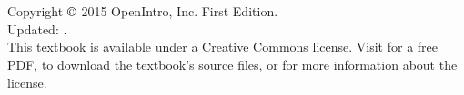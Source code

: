 \chapter*{}

\vfill

\noindent Copyright $\copyright$ 2015 OpenIntro, Inc. First Edition. \\
Updated: \versiondate. \\

\noindent This textbook is available under a Creative Commons license. %
Visit  for a free PDF, to download the textbook's source files, or for more information about the license. \\


